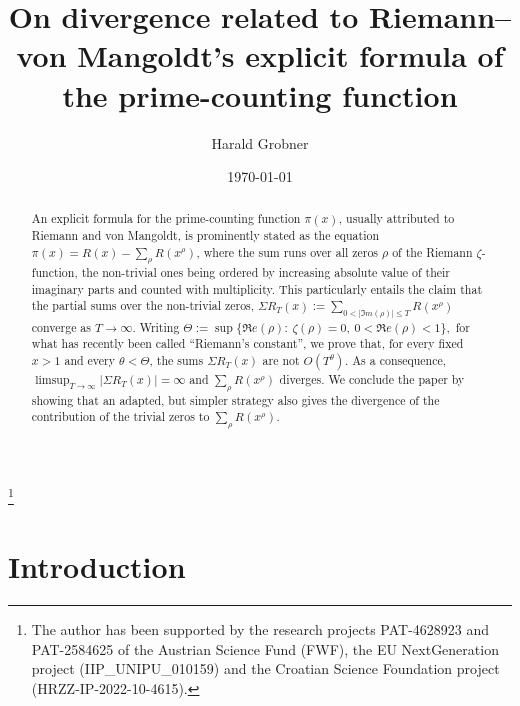 \documentclass[a4paper,10pt]{amsart}
\theoremstyle{definition}
\numberwithin{equation}{section}
\begin{document}
\title[On divergence related to Riemann--von Mangoldt's explicit formula for $\pi(x)$]{On divergence related to Riemann--von Mangoldt's explicit formula of the prime-counting function}
\author{Harald Grobner}
\thanks{The author has been supported by the research projects PAT-4628923 and PAT-2584625 of the Austrian Science Fund (FWF), the EU NextGeneration project (IIP\_UNIPU\_010159) and the Croatian Science Foundation project (HRZZ-IP-2022-10-4615).}
\address{Harald Grobner, Faculty of Mathematics, University of Vienna, Oskar-Morgenstern-Platz 1, A-1090 Vienna, Austria}


\date{\today}

\begin{abstract}
An explicit formula for the prime-counting function $\pi(x)$, usually attributed to Riemann and von Mangoldt, is prominently stated as the equation $\pi(x)=R(x)-\sum_\rho R(x^\rho)$, where the sum runs over all zeros $\rho$ of the Riemann $\zeta$-function, the non-trivial ones being ordered by increasing absolute value of their imaginary parts and counted with multiplicity. This particularly entails the claim that the partial sums over the non-trivial zeros, $\Sigma R_T(x):=\sum_{0<|\Im m(\rho)|\le T} R(x^\rho)$ converge as ${T\to\infty}$. Writing $\Theta:=\sup\{\Re e(\rho):\ \zeta(\rho)=0,\ 0<\Re e(\rho)<1\},$ for what has recently been called ``Riemann's constant'', we prove that, for every fixed $x>1$ and every $\theta<\Theta$, the sums $\Sigma R_T(x)$ are not $O(T^\theta)$.  As a consequence, $\limsup_{{T\to\infty}}|\Sigma R_T(x)|=\infty$ and $\sum_\rho R(x^\rho)$ diverges. We conclude the paper by showing that an adapted, but simpler strategy also gives the divergence of the contribution of the trivial zeros to $\sum_\rho R(x^\rho)$.
\end{abstract}
\maketitle


\vskip 10pt

\setcounter{tocdepth}{2}
\tableofcontents


\section*{Introduction}
\end{document}
